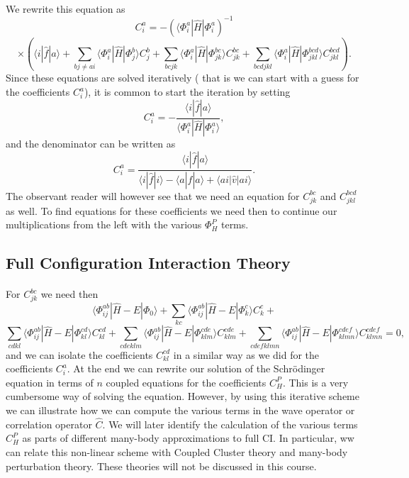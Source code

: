 \documentclass[%
twoside,                 %
final,                   %
10pt]{article}
\begin{document}
\paragraph{}
We rewrite this equation as
\[
C_{i}^{a}=-(\langle \Phi_i^a | \hat{H}|\Phi_{i}^{a})^{-1}
\]
\[
\times\left(\langle i | \hat{f}| a\rangle+ \sum_{bj\ne ai}\langle \Phi_i^a | \hat{H}|\Phi_{j}^{b} \rangle C_{j}^{b}+\sum_{bcjk}\langle \Phi_i^a | \hat{H}|\Phi_{jk}^{bc} \rangle C_{jk}^{bc}+
\sum_{bcdjkl}\langle \Phi_i^a | \hat{H}|\Phi_{jkl}^{bcd} \rangle C_{jkl}^{bcd}\right).
\]
Since these equations are solved iteratively ( that is we can start with a guess for the coefficients $C_i^a$), it is common to start the  iteration 
by setting 
\[
 C_{i}^{a}=-\frac{\langle i | \hat{f}| a\rangle}{\langle \Phi_i^a | \hat{H}|\Phi_{i}^{a}\rangle},
\]
and the denominator can be written as
\[
  C_{i}^{a}=\frac{\langle i | \hat{f}| a\rangle}{\langle i | \hat{f}| i\rangle-\langle a | \hat{f}| a\rangle+\langle ai | \hat{v}| ai\rangle}.
\]
The observant reader will however see that we need an equation for $C_{jk}^{bc}$ and $C_{jkl}^{bcd}$ as well.
To find equations for these coefficients we need then to continue our multiplications from the left with the various
$\Phi_{H}^P$ terms.



\subsection*{Full Configuration Interaction Theory}

\paragraph{}
For $C_{jk}^{bc}$ we need then
\[
\langle \Phi_{ij}^{ab} | \hat{H} -E| \Phi_0\rangle + \sum_{kc}\langle \Phi_{ij}^{ab} | \hat{H} -E|\Phi_{k}^{c} \rangle C_{k}^{c}+
\]
\[
\sum_{cdkl}\langle \Phi_{ij}^{ab} | \hat{H} -E|\Phi_{kl}^{cd} \rangle C_{kl}^{cd}+\sum_{cdeklm}\langle \Phi_{ij}^{ab} | \hat{H} -E|\Phi_{klm}^{cde} \rangle C_{klm}^{cde}+\sum_{cdefklmn}\langle \Phi_{ij}^{ab} | \hat{H} -E|\Phi_{klmn}^{cdef} \rangle C_{klmn}^{cdef}=0,
\]
and we can isolate the coefficients $C_{kl}^{cd}$ in a similar way as we did for the coefficients $C_{i}^{a}$. 
At the end we can rewrite our solution of the Schr\"odinger equation in terms of $n$ coupled equations for the coefficients $C_H^P$.
This is a very cumbersome way of solving the equation. However, by using this iterative scheme we can illustrate how we can compute the
various terms in the wave operator or correlation operator $\hat{C}$. We will later identify the calculation of the various terms $C_H^P$
as parts of different many-body approximations to full CI. In particular, ww can  relate this non-linear scheme with Coupled Cluster theory and
many-body perturbation theory. These theories will not be discussed in this course.
\end{document}
